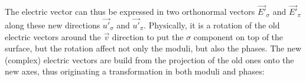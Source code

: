 \documentclass{iucr}
\begin{document}







The electric vector can thus be expressed in two orthonormal vectors $\vec{E'}_\sigma$ and $\vec{E'}_\pi$ along these 
new directions $\vec{u'}_\sigma$ and $\vec{u'}_\pi$. Physically, it is a rotation of the old electric vectors around
the $\vec{v}$ direction to put the $\sigma$ component on top of the surface, but the rotation affect not only the 
moduli, but also the phases. The new (complex) electric vectors are build from the projection of the old ones onto the
new axes, thus originating a transformation in both moduli and phases:
\end{document}
